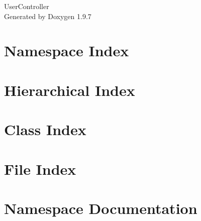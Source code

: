 \documentclass[twoside]{book}
\newcommand{\+}{\discretionary{\mbox{\scriptsize$\hookleftarrow$}}{}{}}
\newcommand{\clearemptydoublepage}{%
    \newpage{\pagestyle{empty}\cleardoublepage}%
  }
\begin{document}
  \raggedbottom
    \hypersetup{pageanchor=false,
                bookmarksnumbered=true,
                pdfencoding=unicode
               }
  \begin{titlepage}
  \vspace*{7cm}
  \begin{center}%
  {\Large User\+Controller}\\
  \vspace*{1cm}
  {\large Generated by Doxygen 1.9.7}\\
  \end{center}
  \end{titlepage}
  \clearemptydoublepage
  \tableofcontents
  \clearemptydoublepage
  \hypersetup{pageanchor=true}
\chapter{Namespace Index}

\chapter{Hierarchical Index}

\chapter{Class Index}

\chapter{File Index}

\chapter{Namespace Documentation}

















\end{document}
